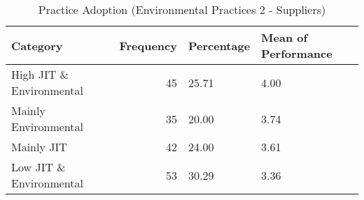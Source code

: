 \begin{table}[htbp]
    \centering
    \caption{Practice Adoption (Environmental Practices 2 - Suppliers)}
    \label{tab:your_label}
    \begin{tabular}{lrll}
\toprule
Category & Frequency & Percentage & Mean of Performance \\
\midrule
High JIT \& Environmental & 45 & 25.71 & 4.00 \\
Mainly Environmental & 35 & 20.00 & 3.74 \\
Mainly JIT & 42 & 24.00 & 3.61 \\
Low JIT \& Environmental & 53 & 30.29 & 3.36 \\
\bottomrule
\end{tabular}

    \end{table}
    